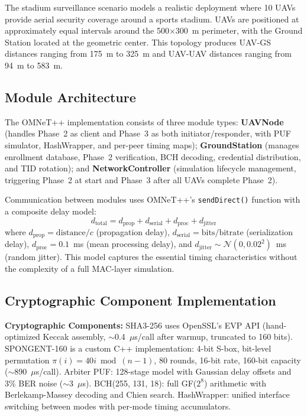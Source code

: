 \documentclass[11pt,a4paper]{article}
\begin{document}
The stadium surveillance scenario models a realistic deployment where 10 UAVs provide aerial security coverage around a sports stadium. UAVs are positioned at approximately equal intervals around the 500$\times$300~m perimeter, with the Ground Station located at the geometric center. This topology produces UAV-GS distances ranging from 175~m to 325~m and UAV-UAV distances ranging from 94~m to 583~m.

\subsection{Module Architecture}

The OMNeT++ implementation consists of three module types: \textbf{UAVNode} (handles Phase~2 as client and Phase~3 as both initiator/responder, with PUF simulator, HashWrapper, and per-peer timing maps); \textbf{GroundStation} (manages enrollment database, Phase~2 verification, BCH decoding, credential distribution, and TID rotation); and \textbf{NetworkController} (simulation lifecycle management, triggering Phase~2 at start and Phase~3 after all UAVs complete Phase~2).

Communication between modules uses OMNeT++'s \texttt{sendDirect()} function with a composite delay model:
\begin{equation}
d_{\text{total}} = d_{\text{prop}} + d_{\text{serial}} + d_{\text{proc}} + d_{\text{jitter}}
\end{equation}
where $d_{\text{prop}} = \text{distance}/c$ (propagation delay), $d_{\text{serial}} = \text{bits}/\text{bitrate}$ (serialization delay), $d_{\text{proc}} = 0.1$~ms (mean processing delay), and $d_{\text{jitter}} \sim \mathcal{N}(0, 0.02^2)$~ms (random jitter). This model captures the essential timing characteristics without the complexity of a full MAC-layer simulation.

\subsection{Cryptographic Component Implementation}

\textbf{Cryptographic Components:} SHA3-256 uses OpenSSL's EVP API (hand-optimized Keccak assembly, $\sim$0.4~$\mu$s/call after warmup, truncated to 160 bits). SPONGENT-160 is a custom C++ implementation: 4-bit S-box, bit-level permutation $\pi(i) = 40i \bmod (n-1)$, 80 rounds, 16-bit rate, 160-bit capacity ($\sim$890~$\mu$s/call). Arbiter PUF: 128-stage model with Gaussian delay offsets and 3\% BER noise ($\sim$3~$\mu$s). BCH(255, 131, 18): full GF($2^8$) arithmetic with Berlekamp-Massey decoding and Chien search. HashWrapper: unified interface switching between modes with per-mode timing accumulators.
\end{document}
